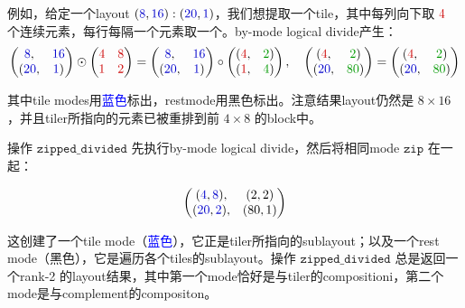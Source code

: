 \documentclass{article}
\begin{document}
例如，给定一个layout \( (\textcolor{blue}{8}, \textcolor{blue}{16}) : (\textcolor{blue}{20}, \textcolor{blue}{1}) \)，我们想提取一个tile，其中每列向下取 \( \textcolor{red}{4} \) 个连续元素，每行每隔一个元素取一个。by-mode logical divide产生：
\[
\begin{pmatrix}
\textcolor{blue}{8}, & \textcolor{blue}{16} \\
(\textcolor{blue}{20}, & \textcolor{blue}{1})
\end{pmatrix} \odot \begin{pmatrix}
\textcolor{red}{4} & \textcolor{red}{8} \\
\textcolor{red}{1} & \textcolor{red}{2}
\end{pmatrix} =
\begin{pmatrix}
\textcolor{blue}{8}, & \textcolor{blue}{16} \\
(\textcolor{blue}{20}, & \textcolor{blue}{1})
\end{pmatrix} \circ \begin{pmatrix}
(\textcolor{red}{4}, & \textcolor{green}{2}) \\
(\textcolor{red}{1}, & \textcolor{green}{4})
\end{pmatrix}, \quad
\begin{pmatrix}
(\textcolor{red}{4}, & \textcolor{green}{2}) \\
(\textcolor{blue}{20}, & \textcolor{green}{80})
\end{pmatrix} =
\begin{pmatrix}
(\textcolor{red}{4}, & \textcolor{green}{2}) \\
(\textcolor{blue}{20}, & \textcolor{green}{80})
\end{pmatrix}
\]

其中tile modes用\textcolor{blue}{蓝色}标出，restmode用黑色标出。注意结果layout仍然是 \(8\times16\)，并且tiler所指向的元素已被重排到前 \(4\times8\) 的block中。

操作 \(\texttt{zipped\_divided}\) 先执行by-mode logical divide，然后将相同mode \(\texttt{zip}\) 在一起：

\[
\begin{pmatrix}
(\textcolor{blue}{4}, \textcolor{blue}{8}), & (\textcolor{black}{2}, \textcolor{black}{2}) \\
(\textcolor{blue}{20}, \textcolor{blue}{2}), & (\textcolor{black}{80}, \textcolor{black}{1})
\end{pmatrix}
\]

这创建了一个tile mode（\textcolor{blue}{蓝色}），它正是tiler所指向的sublayout；以及一个rest mode（黑色），它是遍历各个tiles的sublayout。操作 \(\texttt{zipped\_divided}\) 总是返回一个rank-2 的layout结果，其中第一个mode恰好是与tiler的compositioni，第二个mode是与complement的compositon。
\end{document}
